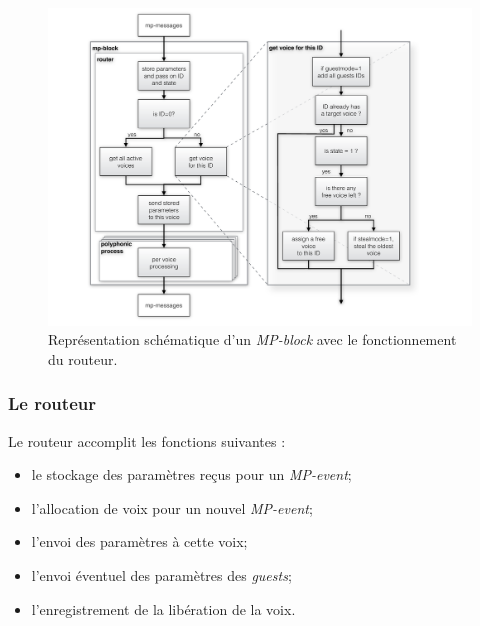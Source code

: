 \begin{figure}[!htbp]
	\captionsetup{format=plain}
	\includegraphics[width=\textwidth]{gfx/04_algorithms/MP-block-model.pdf}
	\caption[Représentation schématique d'un \textit{MP-block}]{Représentation schématique d'un \textit{MP-block} avec le fonctionnement du routeur.}
	\label{fig:algorithms:MP-block-model}
\end{figure}


\subsubsection{Le routeur}

\noindent Le routeur accomplit les fonctions suivantes :
\vspace{-1em}
\begin{itemize}[noitemsep]
	\item le stockage des paramètres reçus pour un \textit{MP-event};
	\item l'allocation de voix pour un nouvel \textit{MP-event};
	\item l'envoi des paramètres à cette voix;
	\item l'envoi éventuel des paramètres des \textit{guests};
	\item l'enregistrement de la libération de la voix.
\end{itemize}

